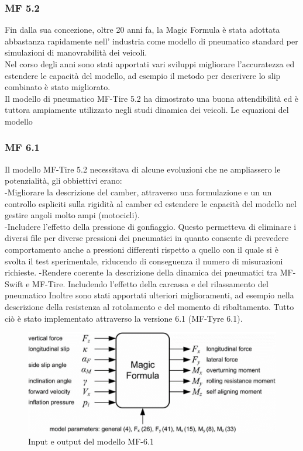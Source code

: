 \subsubsection{MF 5.2}
Fin dalla sua concezione, oltre 20 anni fa, la Magic Formula è stata adottata abbastanza rapidamente nell' industria come modello di pneumatico standard per simulazioni di manovrabilità dei veicoli.\\ 
Nel corso degli anni sono stati apportati vari sviluppi
migliorare l'accuratezza ed estendere le capacità del modello, ad esempio il metodo per descrivere lo slip combinato è stato migliorato.\\
Il modello di pneumatico MF-Tire 5.2 ha dimostrato una buona attendibilità ed è tuttora ampiamente utilizzato negli studi dinamica dei veicoli. 
Le equazioni del modello \\


\subsubsection{MF 6.1}
Il modello MF-Tire 5.2 necessitava di alcune evoluzioni che ne ampliassero le potenzialità,
gli obbiettivi erano:\\
-Migliorare la descrizione del camber, attraverso una formulazione e un un controllo espliciti sulla rigidità al camber ed estendere le capacità del modello nel gestire angoli molto ampi (motocicli).\\
-Includere l'effetto della pressione di gonfiaggio. Questo permetteva di eliminare i diversi file per diverse pressioni dei pneumatici in quanto consente di prevedere 
comportamento anche a pressioni differenti rispetto a quello con il quale si è svolta il test sperimentale, riducendo di conseguenza il numero di misurazioni richieste.
-Rendere coerente la descrizione della dinamica dei pneumatici tra MF-Swift e MF-Tire. Includendo l'effetto della carcassa e del rilassamento del pneumatico 
Inoltre sono stati apportati ulteriori miglioramenti, ad esempio nella descrizione della resistenza al rotolamento e del momento di ribaltamento.
Tutto ciò è stato implementato attraverso la versione 6.1 (MF-Tyre 6.1).\\

\begin{figure}[ht]
    \centering
    \includegraphics[scale=0.6]{Immagini/Tyres/MF.png}
    \caption{Input e output del modello MF-6.1}
    \label{fig:MF_tyres}
\end{figure}

